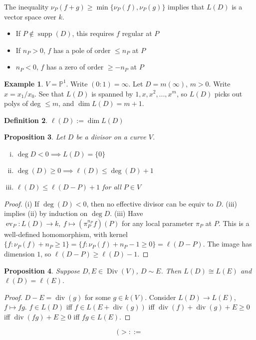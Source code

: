 \documentclass{article}
\theoremstyle{definition}
\newtheorem{defn}{Definition}[section]
\newtheorem{example}[defn]{Example}
\theoremstyle{remark}
\theoremstyle{plain}
\newtheorem{prop}[defn]{Proposition}
\newcommand{\PP}{\mathbb{P}}
\begin{document}
The inequality $\nu_P(f+g)\ge\min\{\nu_P(f),\nu_P(g)\}$ implies that $L(D)$ is a vector space over $k$.
\begin{itemize}
    \item If $P\notin\operatorname{supp}(D)$, this requires $f$ regular at $P$
    \item If $n_P>0$, $f$ has a pole of order $\le n_P$ at $P$
    \item $n_P<0$, $f$ has a zero of order $\ge -n_P$ at $P$
\end{itemize}
\begin{example}
    $V=\PP^1$. Write $(0:1)=\infty$. Let $D=m(\infty)$, $m>0$. Write $x=x_1/x_0$. See that $L(D)$ is spanned by $1,x,x^2,...,x^m$, so $L(D)$ picks out polys of deg $\le m$, and $\dim L(D)=m+1$.
\end{example}
\begin{defn}
    $\ell(D):=\dim L(D)$
\end{defn}
\begin{prop}
    Let $D$ be a divisor on a curve $V$. \begin{enumerate}[(i)]
        \item $\deg D<0\implies L(D)=\{0\}$
        \item $\deg(D)\ge 0\implies \ell(D)\le \deg(D)+1$
        \item $\ell(D)\le \ell(D-P)+1$ for all $P\in V$
    \end{enumerate}
\end{prop}
\begin{proof}
    (i) If $\deg (D)<0$, then no effective divisor can be equiv to $D$.
    (iii) implies (ii) by induction on $\deg D$.
    (iii) Have $\operatorname{ev}_P:L(D)\to k,\ f\mapsto (\pi_P^{n_P}f)(P)$ for any local parameter $\pi_P$ at $P$. This is a well-defined homomorphism, with kernel $\{f:\nu_P(f)+n_P\ge 1\}=\{f:\nu_P(f)+n_P-1\ge 0\}=\ell(D-P)$. The image has dimension $1$, so $\ell(D-P)\ge \ell(D)-1$.
\end{proof}
\begin{prop}
    Suppose $D,E\in\operatorname{Div}(V)$, $D\sim E$. Then $L(D)\cong L(E)$ and $\ell(D)=\ell(E)$.
\end{prop}
\begin{proof}
    $D-E=\operatorname{div}(g)$ for some $g\in k(V)$. Consider $L(D)\to L(E)$, $f\mapsto fg$. $f\in L(D)$ iff $f\in L(E+\operatorname{div}(g))$ iff $\operatorname{div}(f)+\operatorname{div}(g)+E\ge 0$ iff $\operatorname{div}(fg)+E\ge0$ iff $fg\in L(E)$.
\end{proof}
\[(>::=\tag{Owen's Signature}\]
\end{document}

